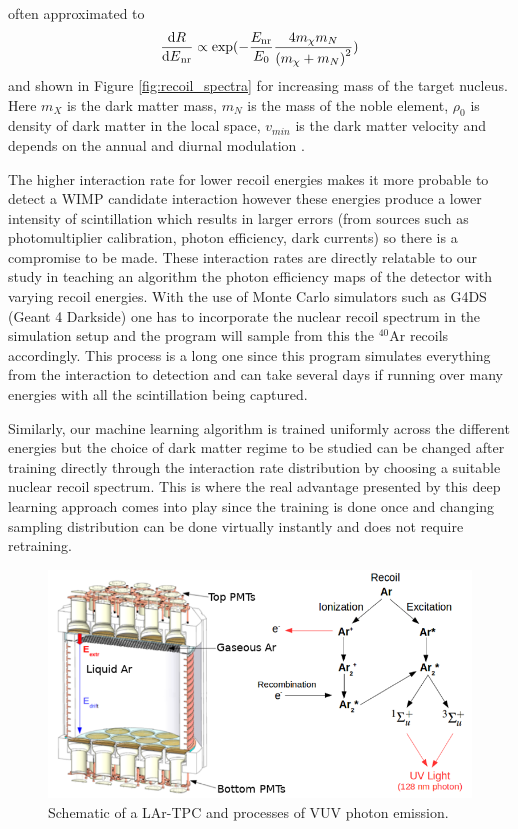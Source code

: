 \documentclass[11pt]{article} %
\begin{document}
often approximated to \cite{lewin1996review}
\begin{equation}
\frac{{\rm{d}}{R}}{{{\rm{d}}{E}}_{\mathrm{nr}}}\propto \exp (- \frac{{E}_{\mathrm{nr}}}{{E}_{0}} \frac{4{m}_{\chi }{m}_{N}}{{({m}_{\chi }+{m}_{N})}^{2}})
\end{equation}
and shown in Figure \ref{fig:recoil_spectra} for increasing mass of the target nucleus.
Here $m_X$ is the dark matter mass, $m_N$ is the mass of the noble element, $\rho_0$ is density of dark matter in the local space,
$v_{min}$ is the dark matter velocity and depends on the annual and diurnal modulation \cite{drukier1986detecting}.
\\
\par The higher interaction rate for lower recoil energies makes it more probable to detect a WIMP candidate interaction
however these energies produce a lower intensity of scintillation which results in larger errors
(from sources such as photomultiplier calibration, photon efficiency, dark currents) so there is a compromise to be made.
These interaction rates are directly relatable to our study in teaching an algorithm the photon efficiency maps of the detector
with varying recoil energies.
With the use of Monte Carlo simulators such as G4DS (Geant 4 Darkside) one has to incorporate the nuclear recoil spectrum in the simulation setup
and the program will sample from this the $^{40}\mathrm{\text{Ar}}$ recoils accordingly.
This process is a long one since this program simulates everything from the interaction to detection and
can take several days if running over many energies with all the scintillation being captured.
\\
\par Similarly, our machine learning algorithm is trained uniformly across the different energies but the choice of
dark matter regime to be studied can be changed after training directly through the interaction rate distribution by choosing a suitable nuclear recoil spectrum.
This is where the real advantage presented by this deep learning approach comes into play since the training is done once and changing
sampling distribution can be done virtually instantly and does not require retraining.
\\
\begin{figure}[H]
\centering
\includegraphics[scale=0.5]{images/detector.png}
\caption{\cite{edkins2017detailed} Schematic of a LAr-TPC and processes of VUV photon emission.}
\label{fig:detector}
\end{figure}
\end{document}
